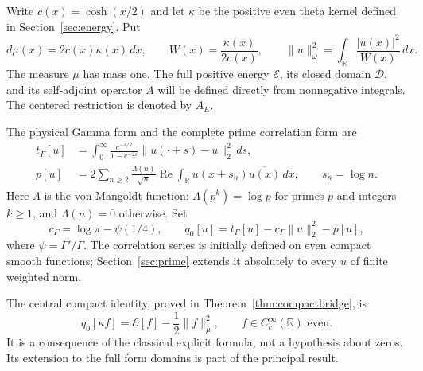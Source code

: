 \documentclass[11pt,a4paper]{article}
\numberwithin{equation}{section}
\theoremstyle{remark}
\newcommand{\R}{\mathbb R}
\newcommand{\E}{\mathcal E}
\newcommand{\D}{\mathcal D}
\newcommand{\tg}{t_{\Gamma}}
\newcommand{\cg}{c_{\Gamma}}
\newcommand{\norm}[1]{\lVert #1\rVert}
\begin{document}
Write $c(x)=\cosh(x/2)$ and let $\kappa$ be the positive even theta kernel defined in Section~\ref{sec:energy}. Put
\begin{equation}\label{eq:weights}
 d\mu(x)=2c(x)\kappa(x)\,dx,\qquad
 W(x)=\frac{\kappa(x)}{2c(x)},\qquad
 \norm{u}_\omega^2=\int_\R\frac{|u(x)|^2}{W(x)}\,dx.
\end{equation}
The measure $\mu$ has mass one. The full positive energy $\E$, its closed domain $\D$, and its self-adjoint operator $A$ will be defined directly from nonnegative integrals. The centered restriction is denoted by $A_E$.

The physical Gamma form and the complete prime correlation form are
\begin{align}
 \tg[u]&=\int_0^\infty\frac{e^{-s/2}}{1-e^{-2s}}
                \norm{u(\cdot+s)-u}_2^2\,ds,\label{eq:physicalgamma}\\
 p[u]&=2\sum_{n\ge2}\frac{\Lambda(n)}{\sqrt n}
             \operatorname{Re}\int_\R u(x+s_n)\overline{u(x)}\,dx,
       \qquad s_n=\log n.\label{eq:physicalprime}
\end{align}
Here $\Lambda$ is the von Mangoldt function: $\Lambda(p^k)=\log p$ for primes $p$ and integers $k\ge1$, and $\Lambda(n)=0$ otherwise. Set
\begin{equation}\label{eq:qzero}
 \cg=\log\pi-\psi(1/4),\qquad
 q_0[u]=\tg[u]-\cg\norm{u}_2^2-p[u],
\end{equation}
where $\psi=\Gamma'/\Gamma$. The correlation series is initially defined on even compact smooth functions; Section~\ref{sec:prime} extends it absolutely to every $u$ of finite weighted norm.

The central compact identity, proved in Theorem~\ref{thm:compactbridge}, is
\begin{equation}\label{eq:bridge}
 q_0[\kappa f]=\E[f]-\frac12\norm{f}_\mu^2,
 \qquad f\in C_c^\infty(\R)\text{ even}.
\end{equation}
It is a consequence of the classical explicit formula, not a hypothesis about zeros. Its extension to the full form domains is part of the principal result.
\end{document}
